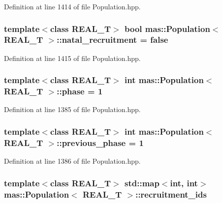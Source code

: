Definition at line 1414 of file Population.\-hpp.

\hypertarget{classmas_1_1_population_add42454aa09f82776039538f7b87a2c9}{
\subsubsection[{natal\-\_\-recruitment}]{\setlength{\rightskip}{0pt plus 5cm}template$<$class R\-E\-A\-L\-\_\-\-T$>$ bool {\bf mas\-::\-Population}$<$ R\-E\-A\-L\-\_\-\-T $>$\-::natal\-\_\-recruitment = false}}\label{classmas_1_1_population_add42454aa09f82776039538f7b87a2c9}


Definition at line 1415 of file Population.\-hpp.

\hypertarget{classmas_1_1_population_ac1239c7b55a78c996eceb83c8c399a0b}{
\subsubsection[{phase}]{\setlength{\rightskip}{0pt plus 5cm}template$<$class R\-E\-A\-L\-\_\-\-T$>$ int {\bf mas\-::\-Population}$<$ R\-E\-A\-L\-\_\-\-T $>$\-::phase = 1}}\label{classmas_1_1_population_ac1239c7b55a78c996eceb83c8c399a0b}


Definition at line 1385 of file Population.\-hpp.

\hypertarget{classmas_1_1_population_a69ed32e9b8a91451da22927333ed7b76}{
\subsubsection[{previous\-\_\-phase}]{\setlength{\rightskip}{0pt plus 5cm}template$<$class R\-E\-A\-L\-\_\-\-T$>$ int {\bf mas\-::\-Population}$<$ R\-E\-A\-L\-\_\-\-T $>$\-::previous\-\_\-phase = 1}}\label{classmas_1_1_population_a69ed32e9b8a91451da22927333ed7b76}


Definition at line 1386 of file Population.\-hpp.

\hypertarget{classmas_1_1_population_a37e238439828debf37c7d69b952c52d4}{
\subsubsection[{recruitment\-\_\-ids}]{\setlength{\rightskip}{0pt plus 5cm}template$<$class R\-E\-A\-L\-\_\-\-T$>$ std\-::map$<$int, int$>$ {\bf mas\-::\-Population}$<$ R\-E\-A\-L\-\_\-\-T $>$\-::recruitment\-\_\-ids}}\label{classmas_1_1_population_a37e238439828debf37c7d69b952c52d4}


